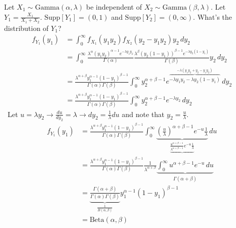 \documentclass[12pt]{article}
\newcommand{\supp}[1]{\text{Supp}[ #1 ]}
\begin{document}
Let $X_1 \sim \text{Gamma}(\alpha, \lambda)$ be independent of $X_2 \sim \text{Gamma}(\beta, \lambda)$. Let $Y_1 = \frac{X_1}{X_1 + X_2}$. $\supp{Y_1} = (0,1)$ and $\supp{Y_2}=(0, \infty)$. What's the distribution of $Y_1$? $$\begin{aligned} 
f_{Y_1}(y_1) &= \int_0^\infty f_{X_1}(y_1y_2)f_{X_2}(y_2 - y_1y_2)y_2 \, dy_2 \\ &= \int_0^\infty \frac{\lambda^{\alpha} (y_1y_2)^{\alpha - 1} e^{-\lambda y_1y_2}}{\Gamma(\alpha)} \frac{\lambda^{\beta} (y_2(1 - y_1))^{\beta - 1} e^{-\lambda y_2(1-y_1)}}{\Gamma(\beta)} y_2 \, dy_2 \\ &= \frac{\lambda^{\alpha + \beta} y_1^{\alpha - 1} (1 - y_1)^{\beta - 1}}{\Gamma(\alpha) \Gamma(\beta)} \int_0^\infty y_2^{\alpha + \beta - 1} e^{\overbrace{-\lambda y_1y_2 - \lambda y_2(1 - y_1)}^{-\lambda(y_1y_2 + y_2 - y_1y_2)}} \, dy_2 \\ &= \frac{\lambda^{\alpha + \beta} y_1^{\alpha - 1} (1 - y_1)^{\beta - 1}}{\Gamma(\alpha)\Gamma(\beta)} \int_0^\infty y_2^{\alpha + \beta - 1} e^{-\lambda y_2} \, dy_2 \end{aligned} $$ \ Let $ u = \lambda y_2 \to \frac{du}{dy_2} = \lambda \to dy_2 = \frac{1}{\lambda}du$ and note that $y_2 = \frac{u}{\lambda}$. $$\begin{aligned}  f_{Y_1}(y_1) &= \frac{\lambda^{\alpha + \beta} y_1^{\alpha - 1} (1 - y_1)^{\beta - 1}}{\Gamma(\alpha)\Gamma(\beta)}\int_0^\infty \underbrace{(\frac{u}{\lambda})^{\alpha + \beta - 1} e^{-u}\frac{1}{\lambda}}_{\underbrace{\frac{u^{\alpha + \beta - 1}}{\lambda^{\alpha + \beta - 1}} e^{-u} \frac{1}{\lambda}}} \, du \\ &= \frac{\lambda^{\alpha + \beta} y_1^{\alpha - 1} (1 - y_1)^{\beta - 1}}{\Gamma(\alpha)\Gamma(\beta)} \frac{1}{\lambda^{\alpha + \beta}} \underbrace{\int_0^\infty u^{\alpha + \beta - 1} e^{-u} \, du}_{\Gamma(\alpha + \beta)} \\ &= \underbrace{\frac{\Gamma(\alpha + \beta)}{\Gamma(\alpha)\Gamma(\beta)}}_{\frac{1}{B(\alpha, \beta)}}y_1^{\alpha - 1} (1 - y_1)^{\beta - 1} \\ &= \text{Beta}(\alpha, \beta)  \end{aligned} $$  
\end{document}
